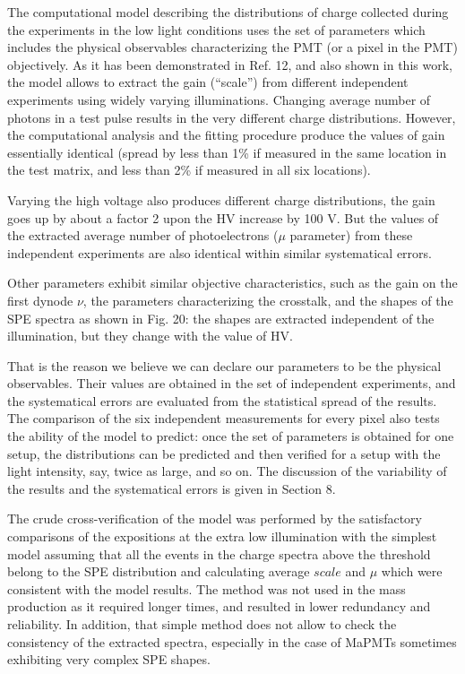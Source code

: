 \documentclass[11pt]{report}
\begin{document}
The computational model describing the distributions of charge collected during the experiments in the low light conditions uses the set of parameters which includes the physical observables characterizing the PMT (or a pixel in the PMT) objectively. As it has been demonstrated in Ref. 12, and also shown in this work, the model allows to extract the gain (``scale'') from different independent experiments using widely varying illuminations. Changing average number of photons in a test pulse results in the very different charge distributions. However, the computational analysis and the fitting procedure produce the values of gain essentially identical (spread by less than 1\% if measured in the same location in the test matrix, and less than 2\% if measured in all six locations). 


Varying the high voltage also produces different charge distributions, the gain goes up by about a factor 2 upon the HV increase by 100 V. But the values of the extracted average number of photoelectrons ($\mu$ parameter) from these independent experiments are also identical within similar systematical errors. 

Other parameters exhibit similar objective characteristics, such as the gain on the first dynode $\nu$, the parameters characterizing the crosstalk, and the shapes of the SPE spectra as shown in Fig. 20: the shapes are extracted independent of the illumination, but they change with the value of HV.

That is the reason we believe we can declare our parameters to be the physical observables. Their values are obtained in the set of independent experiments, and the systematical errors are evaluated from the statistical spread of the results. The comparison of the six independent measurements for every pixel also tests the ability of the model to predict: once the set of parameters is obtained for one setup, the distributions can be predicted and then verified for a setup with the light intensity, say, twice as large, and so on. The discussion of the variability of the results and the systematical errors is given in Section 8.

The crude cross-verification of the model was performed by the satisfactory comparisons of the expositions at the extra low illumination with the simplest model assuming that all the events in the charge spectra above the threshold belong to the SPE distribution and calculating average $scale$ and $\mu$ which were consistent with the model results. The method was not used in the mass production as it required longer times, and resulted in lower redundancy and reliability. In addition, that simple method does not allow to check the consistency of the extracted spectra, especially in the case of MaPMTs sometimes exhibiting very complex SPE shapes.    
\end{document}
